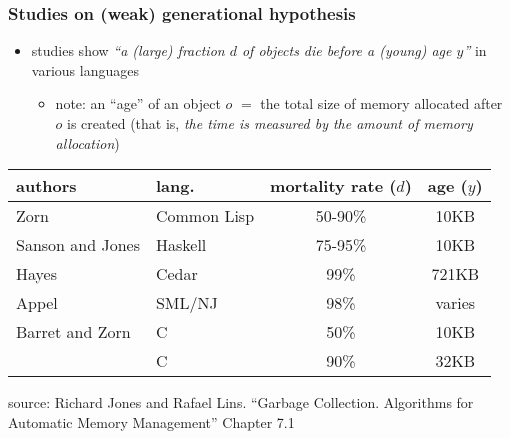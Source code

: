 \documentclass[11pt,dvipdfmx]{beamer}
\newif\ifja
\newif\ifeng
\newcommand{\ao}[1]{{\color{blue}#1}}
\begin{document}
\begin{frame}
\frametitle{Studies on (weak) generational hypothesis}
\begin{itemize}
\item studies show 
  \ao{\it ``a (large) fraction $d$ of objects die
  before a (young) age $y$''} in various languages

\begin{itemize}
\item note: an ``age'' of an object $o$ $=$
  the total size of memory allocated after $o$ is created
  (that is, \ao{\it the time is measured by the amount of memory allocation})
\end{itemize}
\end{itemize}

\begin{center}
  {\footnotesize
\begin{tabular}{|l|l|c|c|}\hline
authors & lang. & mortality rate ($d$) & age ($y$) \\\hline
Zorn & Common Lisp & 50-90\% & 10KB \\
Sanson and Jones & Haskell & 75-95\% & 10KB \\
Hayes & Cedar & 99\% & 721KB \\
Appel & SML/NJ & 98\% & varies \\
Barret and Zorn & C & 50\% & 10KB \\
                & C & 90\% & 32KB \\\hline
\end{tabular}}
\end{center}

source: Richard Jones and Rafael Lins. ``Garbage
Collection. Algorithms for Automatic Memory
Management'' Chapter 7.1
\end{frame}
\fi

\ifja
\begin{frame}
\frametitle{「ほとんどが短命」と世代別GCの根拠}

\begin{itemize}
\item 例えば90\%が10KB以内に死ぬのであれば，
\[ \mbox{最近10KBを走査した時のmark-cons比} \approx 0.1 \]
\item 一方，生きているオブジェクトの2〜3倍のヒープサイズを使う場合，
\[ \mbox{全てを走査した時のmark-cons比} \approx 1/3 \mbox{〜} 1/2 > 0.1 \]
\end{itemize}

\end{frame}
\fi
\ifeng
\begin{frame}
\frametitle{``most objects die young'' and a rational of generational GCs}

\begin{itemize}
\item say 90\% die younger than 10KB, then
\[ \mbox{mark-cons ratio when traversing most recent 10KB} \approx \ao{0.1} \]
\item if we use heap 2-3 times larger than the live objects,
  \[ \mbox{the ratio when traversing the entire heap} \approx
    \ao{1/3 \mbox{〜} 1/2} > 0.1 \]
\end{itemize}

\end{frame}
\fi
\end{document}
